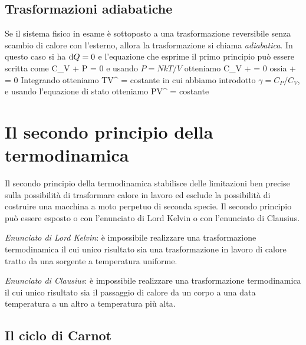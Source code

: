 \subsection{Trasformazioni adiabatiche}

Se il sistema fisico in esame è sottoposto a una trasformazione reversibile senza scambio di calore con l'esterno, allora la trasformazione si chiama {\em adiabatica}. In questo caso si ha ${\textrm d}Q = 0$ e l'equazione che esprime il primo principio può essere scritta come
\be
\label{eq:adiabatica-uno}
C_{V} + P = 0 
\ee
e usando $P = NkT/V$ otteniamo
\be
C_{V} +  = 0 
\ee
ossia
\be
{} +  = 0 
\ee
Integrando otteniamo
\be
\label{eq:adiabatica-due}
TV^{} = \textrm{costante} 
\ee
in cui abbiamo introdotto $\gamma = C_{P}/C_{V}$, e usando l'equazione di stato otteniamo
\be
\label{eq:adiabatica-tre}
PV^{\gamma} = \textrm{costante} 
\ee

\section{Il secondo principio della termodinamica}
\label{sec1:secondo}

Il secondo principio della termodinamica stabilisce delle limitazioni ben precise sulla possibilità di trasformare calore in lavoro ed esclude la possibilità di costruire una macchina a moto perpetuo di seconda specie. Il secondo principio può essere esposto o con l'enunciato di Lord Kelvin o con l'enunciato di Clausius. 

{\em Enunciato di Lord Kelvin}: è impossibile realizzare una trasformazione termodinamica il cui unico risultato sia una trasformazione in lavoro di calore tratto da una sorgente a temperatura uniforme.

{\em Enunciato di Clausius}: è impossibile realizzare una trasformazione termodinamica il cui unico risultato sia il passaggio di calore da un corpo a una data temperatura a un altro a temperatura più alta.

\subsection{Il ciclo di Carnot}

